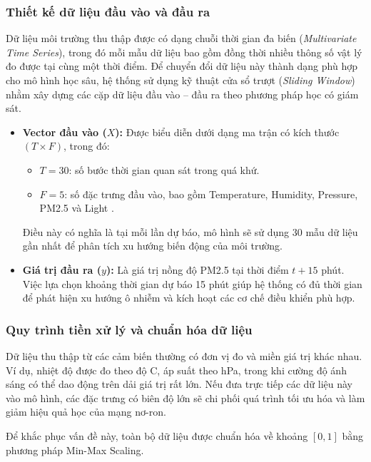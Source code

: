 \subsubsection{Thiết kế dữ liệu đầu vào và đầu ra}

Dữ liệu môi trường thu thập được có dạng chuỗi thời gian đa biến (\textit{Multivariate Time Series}), trong đó mỗi mẫu dữ liệu bao gồm đồng thời nhiều thông số vật lý đo được tại cùng một thời điểm. Để chuyển đổi dữ liệu này thành dạng phù hợp cho mô hình học sâu, hệ thống sử dụng kỹ thuật cửa sổ trượt (\textit{Sliding Window}) nhằm xây dựng các cặp dữ liệu đầu vào -- đầu ra theo phương pháp học có giám sát.

\begin{itemize}
    \item \textbf{Vector đầu vào ($X$):}  
    Được biểu diễn dưới dạng ma trận có kích thước $(T \times F)$, trong đó:
    \begin{itemize}
        \item $T = 30$: số bước thời gian quan sát trong quá khứ.
        \item $F = 5$: số đặc trưng đầu vào, bao gồm Temperature, Humidity, Pressure, PM2.5 và Light .
    \end{itemize}

    Điều này có nghĩa là tại mỗi lần dự báo, mô hình sẽ sử dụng 30 mẫu dữ liệu gần nhất để phân tích xu hướng biến động của môi trường.

    \item \textbf{Giá trị đầu ra ($y$):}  
    Là giá trị nồng độ PM2.5 tại thời điểm $t + 15$ phút. Việc lựa chọn khoảng thời gian dự báo 15 phút giúp hệ thống có đủ thời gian để phát hiện xu hướng ô nhiễm và kích hoạt các cơ chế điều khiển phù hợp.
\end{itemize}

\subsubsection{Quy trình tiền xử lý và chuẩn hóa dữ liệu}

Dữ liệu thu thập từ các cảm biến thường có đơn vị đo và miền giá trị khác nhau. Ví dụ, nhiệt độ được đo theo độ C, áp suất theo hPa, trong khi cường độ ánh sáng có thể dao động trên dải giá trị rất lớn. Nếu đưa trực tiếp các dữ liệu này vào mô hình, các đặc trưng có biên độ lớn sẽ chi phối quá trình tối ưu hóa và làm giảm hiệu quả học của mạng nơ-ron.

Để khắc phục vấn đề này, toàn bộ dữ liệu được chuẩn hóa về khoảng $[0, 1]$ bằng phương pháp Min-Max Scaling.

